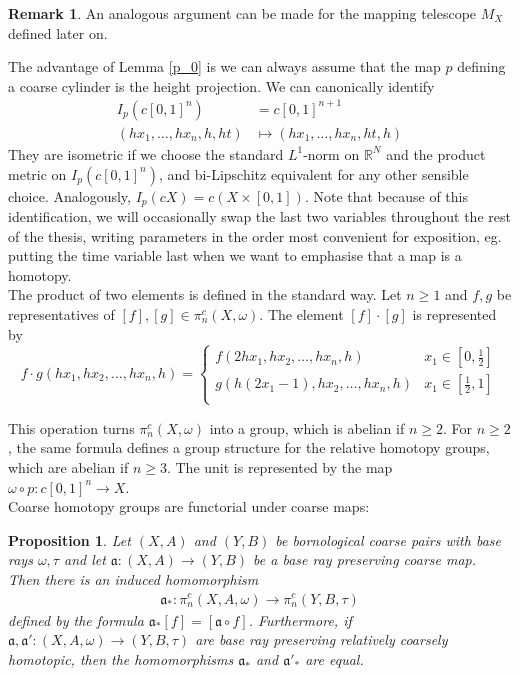 \documentclass[a4paper,11pt]{article}
\theoremstyle{definition}
\newtheorem*{remark}{Remark}
\theoremstyle{plain}
\newtheorem{prop}[definition]{Proposition}
\theoremstyle{remark}
\begin{document}
\begin{remark} An analogous argument can be made for the mapping telescope $M_{X}$ defined later on. \end{remark}

The advantage of  Lemma \ref{p_0} is we can always assume that the map $p$ defining a coarse cylinder is the height projection. We can canonically identify
\begin{align*}
I_{p}(c[0,1]^n) &= c[0,1]^{n+1}\\
(hx_1,\dots, hx_n,h,ht)&\mapsto (hx_1,\dots, hx_n,ht,h)
\end{align*} 
They are isometric if we choose the standard $L^1$-norm on $\mathbb{R}^{N}$ and the product metric on $I_{p}(c[0,1]^n)$, and bi-Lipschitz equivalent for any other sensible choice. Analogously, $I_{p}(cX) = c(X \times [0,1])$. Note that because of this identification, we will occasionally swap the last two variables throughout the rest of the thesis, writing parameters in the order most convenient for exposition, eg. putting the time variable last when we want to emphasise that a map is a homotopy. \\

The product of two elements is defined in the standard way. Let $n\geq 1$ and $f,g$ be representatives of $[f],[g]\in \pi_n^{c}(X,\omega)$. The element $[f]\cdot [g]$ is represented by 
\[ f \cdot g(hx_1,hx_2,\dots, hx_n, h) = \begin{cases} 
          f(2hx_1,hx_2,\dots, hx_n, h) &  x_1\in [0, \frac{1}{2}]\\
         g(h(2x_1-1),hx_2,\dots, hx_n, h) &  x_1 \in [\frac{1}{2},1]\\ 
       \end{cases}
    \]

This operation turns $\pi_n^{c}(X,\omega)$ into a group, which is abelian if $n\geq 2$. For $n\geq 2$, the same formula defines a group structure for the relative homotopy groups, which are abelian if $n\geq 3$. The unit is represented by the map $\omega \circ p: c[0,1]^n \rightarrow X$. \\

Coarse homotopy groups are functorial under coarse maps: 

\begin{prop} \label{functorial} Let $(X,A)$ and $(Y,B)$ be bornological coarse pairs with base rays $\omega,\tau$ and let $\mathfrak{a}: (X,A)\rightarrow (Y,B)$ be a base ray preserving coarse map. Then there is an induced homomorphism
\begin{align*}
\mathfrak{a}_{*}: \pi_n^c(X,A,\omega)\rightarrow \pi_{n}^c(Y,B,\tau)
\end{align*}
defined by the formula $\mathfrak{a}_*[f]=[\mathfrak{a} \circ f]$. Furthermore, if $\mathfrak{a}, \mathfrak{a}': (X,A,\omega)\rightarrow (Y,B,\tau)$ are base ray preserving relatively coarsely homotopic, then the homomorphisms $\mathfrak{a}_*$ and $\mathfrak{a}'_*$ are equal.
\end{prop}
\end{document}
